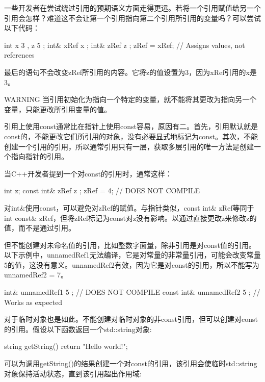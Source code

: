 一些开发者在尝试绕过引用的预期语义方面走得更远。若将一个引用赋值给另一个引用会怎样？难道这不会让第一个引用指向第二个引用所引用的变量吗？可以尝试以下代码：

\begin{cpp}
int x { 3 }, z { 5 };
int& xRef { x };
int& zRef { z };
zRef = xRef; // Assigns values, not references
\end{cpp}

最后的语句不会改变zRef所引用的内容。它将z的值设置为3，因为xRef引用的x是3。

\begin{myWarning}{WARNING}
当引用初始化为指向一个特定的变量，就不能将其更改为指向另一个变量，只能更改所引用变量的值。
\end{myWarning}


引用上使用const通常比在指针上使用const容易，原因有二。首先，引用默认就是const的，不能更改它们所引用的对象，没有必要显式地标记为const。其次，不能创建一个引用的引用，所以通常引用只有一层，获取多层引用的唯一方法是创建一个指向指针的引用。

当C++开发者提到一个对const的引用时，通常这样：

\begin{cpp}
int z;
const int& zRef { z };
zRef = 4; // DOES NOT COMPILE
\end{cpp}

对int\&使用const，可以避免对zRef的赋值。与指针类似，const int\& zRef等同于int const\& zRef，但将zRef标记为const对z没有影响。以通过直接更改z来修改z的值，而不是通过引用。

但不能创建对未命名值的引用，比如整数字面量，除非引用是对const值的引用。以下示例中，unnamedRef1无法编译，它是对常量的非常量引用，可能会改变常量5的值，这没有意义。unnamedRef2有效，因为它是对const的引用，所以不能写为unnamedRef2 = 7。

\begin{cpp}
int& unnamedRef1 { 5 }; // DOES NOT COMPILE
const int& unnamedRef2 { 5 }; // Works as expected
\end{cpp}

对于临时对象也是如此。不能创建对临时对象的非const引用，但可以创建对const的引用。假设以下函数返回一个std::string对象:

\begin{cpp}
string getString() { return "Hello world!"; }
\end{cpp}

可以为调用getString()的结果创建一个对const的引用，该引用会使临时std::string对象保持活动状态，直到该引用超出作用域:

